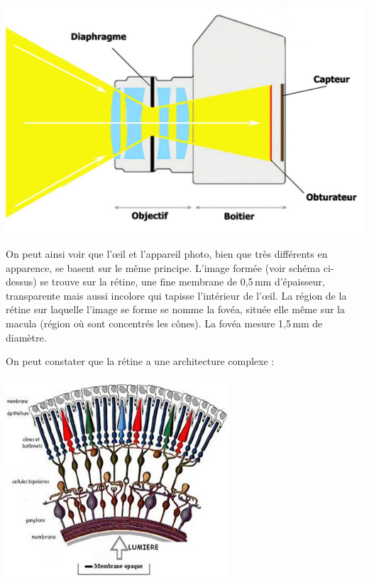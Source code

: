 \documentclass[12pt, a4paper]{report}
\begin{document}
\begin{center}
\includegraphics[scale=0.16]{appareil.jpg}
\end{center}

On peut ainsi voir que l'\oe il et l'appareil photo, bien que très différents en apparence, se basent sur le même principe. L'image formée (voir schéma ci-dessus) se trouve sur la rétine, une fine membrane de 0,5\,mm d'épaisseur, transparente mais aussi incolore qui tapisse l'intérieur de l'\oe il. La région de la rétine sur laquelle l'image se forme se nomme la fovéa, située elle même sur la macula (région où sont concentrés les cônes). La fovéa mesure 1,5\,mm de diamètre.

\newpage{}

On peut constater que la rétine a une architecture complexe :
\begin{center}
\includegraphics[scale=0.8]{retine.jpg}
\end{center}
\end{document}
